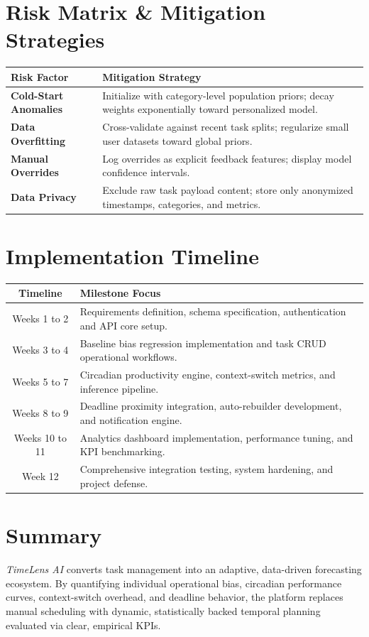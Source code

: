\documentclass[11pt,a4paper]{article}
\begin{document}
\section{Risk Matrix \& Mitigation Strategies}
\begin{table}[htbp]
\centering
\small
\begin{tabularx}{\textwidth}{>{\bfseries}l X}
\toprule
Risk Factor & Mitigation Strategy \\
\midrule
Cold-Start Anomalies & Initialize with category-level population priors; decay weights exponentially toward personalized model. \\
Data Overfitting & Cross-validate against recent task splits; regularize small user datasets toward global priors. \\
Manual Overrides & Log overrides as explicit feedback features; display model confidence intervals. \\
Data Privacy & Exclude raw task payload content; store only anonymized timestamps, categories, and metrics. \\
\bottomrule
\end{tabularx}
\end{table}

\section{Implementation Timeline}
\begin{table}[htbp]
\centering
\small
\begin{tabularx}{\textwidth}{c X}
\toprule
\textbf{Timeline} & \textbf{Milestone Focus} \\
\midrule
Weeks 1 to 2 & Requirements definition, schema specification, authentication and API core setup. \\
Weeks 3 to 4 & Baseline bias regression implementation and task CRUD operational workflows. \\
Weeks 5 to 7 & Circadian productivity engine, context-switch metrics, and inference pipeline. \\
Weeks 8 to 9 & Deadline proximity integration, auto-rebuilder development, and notification engine. \\
Weeks 10 to 11 & Analytics dashboard implementation, performance tuning, and KPI benchmarking. \\
Week 12 & Comprehensive integration testing, system hardening, and project defense. \\
\bottomrule
\end{tabularx}
\end{table}

\section{Summary}
\textit{TimeLens AI} converts task management into an adaptive, data-driven forecasting ecosystem. By quantifying individual operational bias, circadian performance curves, context-switch overhead, and deadline behavior, the platform replaces manual scheduling with dynamic, statistically backed temporal planning evaluated via clear, empirical KPIs.
\end{document}
